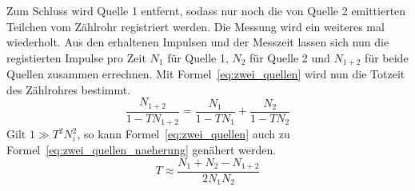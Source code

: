 Zum Schluss wird Quelle 1 entfernt, sodass nur noch die von Quelle 2
emittierten Teilchen vom Zählrohr registriert werden. Die Messung wird
ein weiteres mal wiederholt.  Aus den erhaltenen Impulsen und der
Messzeit lassen sich nun die registierten Impulse pro Zeit $N_1$ für
Quelle 1, $N_2$ für Quelle 2 und $N_{1+2}$ für beide Quellen zusammen
errechnen. Mit Formel~\eqref{eq:zwei_quellen} wird nun die Totzeit des
Zählrohres bestimmt.
%
\begin{equation}
\frac{N_{1+2}}{1- TN_{1+2}} = \frac{N_1}{1 - TN_1} + \frac{N_2}{1- TN_2}
\label{eq:zwei_quellen}
\end{equation}
%
Gilt $1 \gg T^2N_i^2$, so kann Formel~\eqref{eq:zwei_quellen} auch zu
Formel~\eqref{eq:zwei_quellen_naeherung} genähert werden.
%
\begin{equation}\label{eq:zwei_quellen_naeherung}
  T \approx \frac{N_1 + N_2 - N_{1+2}}{2N_1N_2}
\end{equation}

\FloatBarrier
